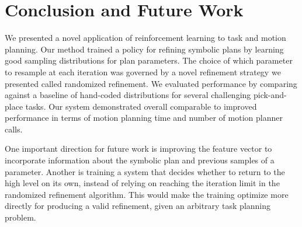 \section{Conclusion and Future Work}
We presented a novel application of reinforcement learning to task
and motion planning. Our method trained a policy for refining symbolic plans
by learning good sampling distributions for plan parameters. The choice
of which parameter to resample at each iteration was governed by a novel
refinement strategy we presented called randomized refinement. We evaluated
performance by comparing against a baseline of hand-coded distributions
for several challenging pick-and-place tasks. Our system demonstrated overall comparable
to improved performance in terms of motion planning time and number of motion planner calls.

One important direction for future work is improving the feature vector to incorporate
information about the symbolic plan and previous samples of a parameter.
Another is training a system that decides
whether to return to the high level on its own, instead of relying on
reaching the iteration limit in the randomized refinement algorithm. This would
make the training optimize more directly for producing a valid refinement,
given an arbitrary task planning problem.